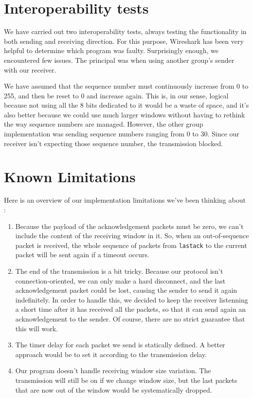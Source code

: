 \documentclass[11pt,a4paper,titlepage]{article}
\newcommand{\blank}{\vspace{11pt}}
\begin{document}
\section{Interoperability tests}
We have carried out two interoperability tests, always testing the functionality in both sending and receiving direction. For this purpose, Wireshark has been very helpful to determine which program was faulty. Surprisingly enough, we encountered few issues. The principal was when using another group's sender with our receiver.
\blank

We have assumed that the sequence number must continuously increase from 0 to 255, and then be reset to 0 and increase again. This is, in our sense, logical because not using all the 8 bits dedicated to it would be a waste of space, and it's also better because we could use much larger windows without having to rethink the way sequence numbers are managed. However, the other group implementation was sending sequence numbers ranging from 0 to 30. Since our receiver isn't expecting those sequence number, the transmission blocked.


\section{Known Limitations}
Here is an overview of our implementation limitations we've been thinking about :
\begin{enumerate}
\item Because the payload of the acknowledgement packets must be zero, we can't include the content of the receiving window in it. So, when an out-of-sequence packet is received, the whole sequence of packets from \texttt{lastack} to the current packet will be sent again if a timeout occurs. 
%
\item The end of the transmission is a bit tricky. Because our protocol isn't connection-oriented, we can only make a hard disconnect, and the last acknowledgement packet could be lost, causing the sender to send it again indefinitely. In order to handle this, we decided to keep the receiver listenning a short time after it has received all the packets, so that it can send again an acknowledgement to the sender. Of course, there are no strict guarantee that this will work.
%
\item The timer delay for each packet we send is statically defined. A better approach would be to set it according to the transmission delay. 
%
\item Our program doesn't handle receiving window size variation. The transmission will still be on if we change window size, but the last packets that are now out of the window would be systematically dropped. 

\end{enumerate}
\end{document}
